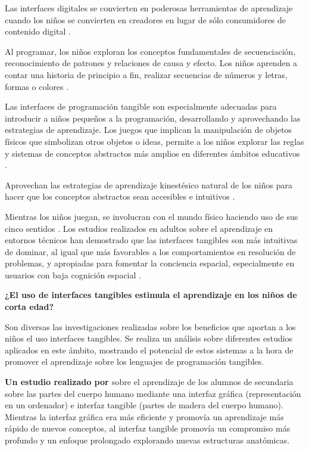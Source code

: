 Las interfaces digitales se convierten en poderosas herramientas de aprendizaje cuando los niños se convierten en creadores en lugar de sólo consumidores de contenido digital \cite{Resnick}. 

Al programar, los niños exploran los conceptos fundamentales de secuenciación, reconocimiento de patrones y relaciones de causa y efecto. Los niños aprenden a contar una historia de principio a fin, realizar secuencias de números y letras, formas o colores \cite{Kazakoff}.

Las interfaces de programación tangible son especialmente adecuadas para introducir a niños pequeños a la programación, desarrollando y aprovechando las estrategias de aprendizaje. Los juegos que implican la manipulación de objetos físicos que simbolizan otros objetos o ideas, permite a los niños explorar las reglas y sistemas de conceptos abstractos más amplios en diferentes ámbitos educativos \cite{Piaget}.

Aprovechan las estrategias de aprendizaje kinestésico natural de los niños para hacer que los conceptos abstractos sean accesibles e intuitivos \cite{Xu}. 

Mientras los niños juegan, se involucran con el mundo físico haciendo uso de sus cinco sentidos \cite{Vygotsky}.
Los estudios realizados en adultos sobre el aprendizaje en entornos técnicos han demostrado que las interfaces tangibles son más intuitivas de dominar, al igual que más favorables a los comportamientos en resolución de problemas, y apropiadas para fomentar la conciencia espacial, especialmente en usuarios con baja cognición espacial \cite{Quarles} \cite{Kim}.

\textbf{¿El uso de interfaces tangibles estimula el aprendizaje en los niños de corta edad?}

Son diversas las investigaciones realizadas sobre los beneficios que aportan a los niños el uso interfaces tangibles. Se realiza un análisis sobre diferentes estudios aplicados en este ámbito, mostrando el potencial de estos sistemas a la hora de promover el aprendizaje sobre los lenguajes de programación tangibles.

\textbf{Un estudio realizado por \cite{Ploderer}} sobre el aprendizaje de los alumnos de secundaria sobre las partes del cuerpo humano mediante una interfaz gráfica (representación en un ordenador) e interfaz tangible (partes de madera del cuerpo humano). Mientras la interfaz gráfica era más eficiente y promovía un aprendizaje más rápido de nuevos conceptos, al interfaz tangible promovía un compromiso más profundo y un enfoque prolongado explorando nuevas estructuras anatómicas.

